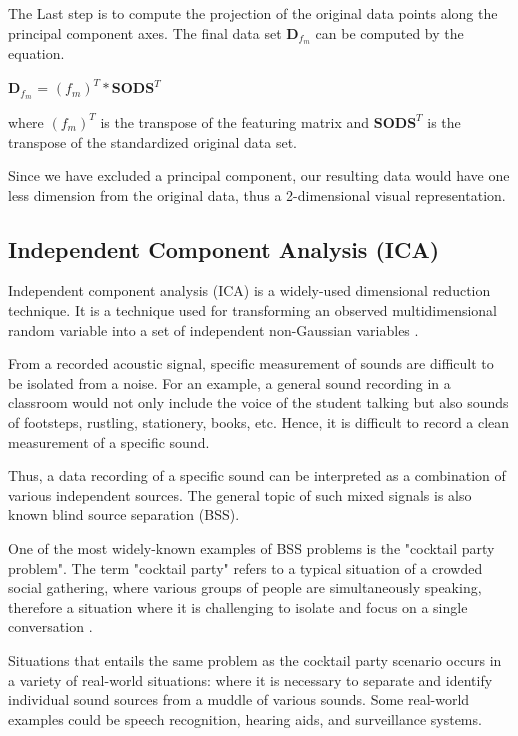 The Last step is to compute the projection of the original data points along the principal component axes. The final data set $\textbf{D}_{f_m}$ can be computed by the equation.

\begin{center}
$\textbf{D}_{f_m}$ = $(f_m)^{T}*\textbf{SODS}^T$
\end{center}

where $(f_m)^T$ is the transpose of the featuring matrix and $\textbf{SODS}^T$ is the transpose of the standardized original data set.

Since we have excluded a principal component, our resulting data would have one less dimension from the original data, thus a 2-dimensional visual representation.


\newpage
\subsection{Independent Component Analysis (ICA)}


Independent component analysis (ICA) is a widely-used dimensional reduction technique. It is a technique used for transforming an observed multidimensional random variable into a set of independent non-Gaussian variables \cite{Tharwat}.

From a recorded acoustic signal, specific measurement of sounds are difficult to be isolated from a noise. For an example, a general sound recording in a classroom would not only include the voice of the student talking but also sounds of footsteps, rustling, stationery, books, etc. Hence, it is difficult to record a clean measurement of a specific sound.

Thus, a data recording of a specific sound can be interpreted as a combination of various independent sources. The general topic of such mixed signals is also known blind source separation (BSS). 

One of the most widely-known examples of BSS problems is the "cocktail party problem". The term "cocktail party" refers to a typical situation of a crowded social gathering, where various groups of people are simultaneously speaking, therefore a situation where it is challenging to isolate and focus on a single conversation \cite{cocktail}.

Situations that entails the same problem as the cocktail party scenario occurs in a variety of real-world situations: where it is necessary to separate and identify individual sound sources from a muddle of various sounds. Some real-world examples could be speech recognition, hearing aids, and surveillance systems.

